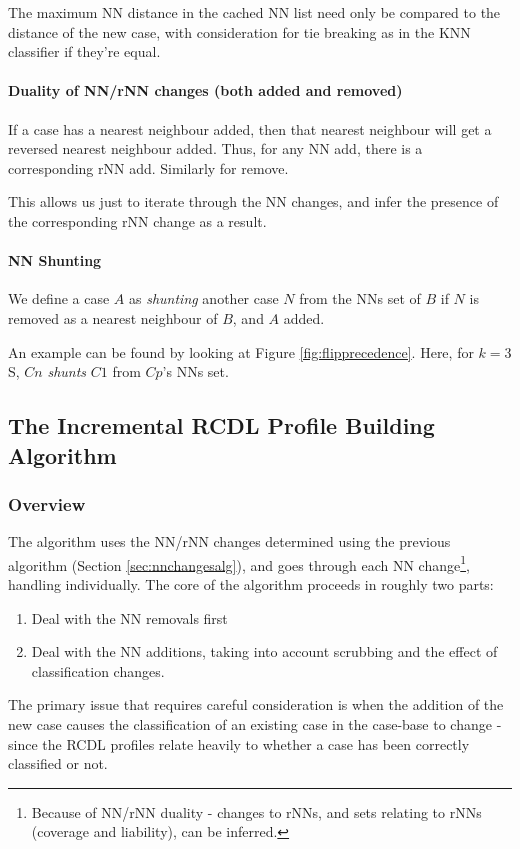 \documentclass[a4paper,11pt]{report}
\begin{document}
The maximum NN distance in the cached NN list need only be compared to the distance of the new case, with consideration for tie breaking as in the KNN classifier if they're equal.

\paragraph{Duality of NN/rNN changes (both added and removed)}
If a case has a nearest neighbour added, then that nearest neighbour will get a reversed nearest neighbour added. Thus, for any NN add, there is a corresponding rNN add. Similarly for remove.

This allows us just to iterate through the NN changes, and infer the presence of the corresponding rNN change as a result.

\paragraph{NN Shunting}
We define a case $A$ as \emph{shunting} another case $N$ from the NNs set of $B$ if $N$ is removed as a nearest neighbour of $B$, and $A$ added.

An example can be found by looking at Figure \ref{fig:flipprecedence}. Here, for $k=3$S, $Cn$ \emph{shunts} $C1$ from $Cp$'s NNs set.

\subsection{The Incremental RCDL Profile Building Algorithm}

\subsubsection{Overview}
The algorithm uses the NN/rNN changes determined using the previous algorithm (Section \ref{sec:nnchangesalg}), and goes through each NN change\footnote{Because of NN/rNN duality - changes to rNNs, and sets relating to rNNs (coverage and liability), can be inferred.}, handling individually. The core of the algorithm proceeds in roughly two parts:
\begin{enumerate}
	\item Deal with the NN removals first
	\item Deal with the NN additions, taking into account scrubbing and the effect of classification changes.
\end{enumerate}

The primary issue that requires careful consideration is when the addition of the new case causes the classification of an existing case in the case-base to change - since the RCDL profiles relate heavily to whether a case has been correctly classified or not.
\end{document}
